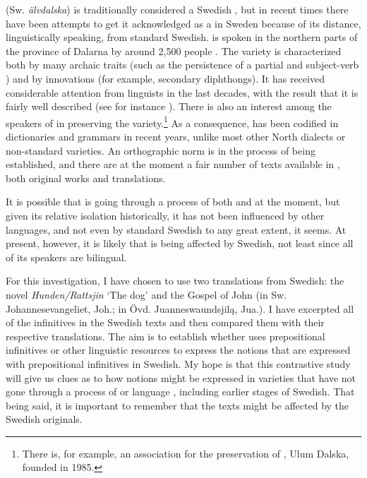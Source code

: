 \documentclass[output=paper]{langscibook}
\begin{document}
 (Sw. \textit{älvdalska}) is traditionally considered a Swedish , but in recent times there have been attempts to get it acknowledged as a  in Sweden because of its distance, linguistically speaking, from standard Swedish.  is spoken in the northern parts of the province of Dalarna by around 2,500 people \citep[27]{Garbacz2009}. The variety is characterized both by many archaic traits (such as the persistence of a partial  and subject-verb ) and by innovations (for example, secondary diphthongs). It has received considerable attention from linguists in the last decades, with the result that it is fairly well described (see for instance \citealt{Garbacz2009,BentzenEtAl2015}). There is also an interest among the speakers of  in preserving the variety.\footnote{There is, for example, an association for the preservation of , Ulum Dalska, founded in 1985.} As a consequence,  has been codified in dictionaries and grammars in recent years, unlike most other North  dialects or non-standard varieties. An orthographic norm is in the process of being established, and there are at the moment a fair number of texts available in , both original works and translations. 

It is possible that  is going through a process of both  and  at the moment, but given its relative isolation historically, it has not been influenced by other languages, and not even by standard Swedish to any great extent, it seems. At present, however, it is likely that  is being affected by Swedish, not least since all of its speakers are bilingual. 

For this investigation, I have chosen to use two  translations from Swedish: the novel \textit{Hunden/Rattsjin} ‘The dog’ and the Gospel of John (in Sw. Johannesevangeliet, Joh.; in Övd. Juanneswaundsjilą, Jua.). I have excerpted all of the  infinitives in the Swedish texts and then compared them with their respective translations. The aim is to establish whether  uses prepositional infinitives or other linguistic resources to express the notions that are expressed with prepositional infinitives in Swedish. My hope is that this contrastive study will give us clues as to how  notions might be expressed in varieties that have not gone through a process of  or language , including earlier stages of Swedish. That being said, it is important to remember that the  texts might be affected by the Swedish originals. 
\end{document}
